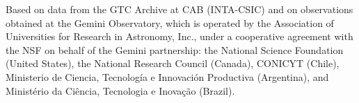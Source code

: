 \documentclass{aa}    %
\begin{document}
\begin{acknowledgements}
%
Based on data from the GTC Archive at CAB (INTA-CSIC) and on observations obtained at the Gemini Observatory, which is operated by the Association of Universities for Research in Astronomy, Inc., under a cooperative agreement with the NSF on behalf of the Gemini partnership: the National Science Foundation (United States), the National Research Council (Canada), CONICYT (Chile), Ministerio de Ciencia, Tecnología e Innovación Productiva (Argentina), and Ministério da Ciência, Tecnologia e Inovação (Brazil).

\end{acknowledgements}



\end{document}
